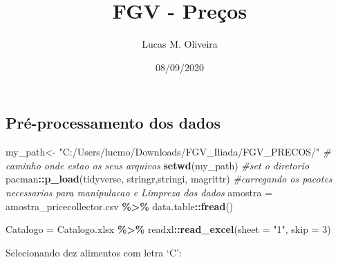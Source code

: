 \documentclass[
]{article}
\title{FGV - Preços}
\author{Lucas M. Oliveira}
\date{08/09/2020}
\newenvironment{Shaded}{\begin{snugshade}}{\end{snugshade}}
\newcommand{\CommentTok}[1]{\textcolor[rgb]{0.56,0.35,0.01}{\textit{#1}}}
\newcommand{\DataTypeTok}[1]{\textcolor[rgb]{0.13,0.29,0.53}{#1}}
\newcommand{\DecValTok}[1]{\textcolor[rgb]{0.00,0.00,0.81}{#1}}
\newcommand{\KeywordTok}[1]{\textcolor[rgb]{0.13,0.29,0.53}{\textbf{#1}}}
\newcommand{\NormalTok}[1]{#1}
\newcommand{\OperatorTok}[1]{\textcolor[rgb]{0.81,0.36,0.00}{\textbf{#1}}}
\newcommand{\StringTok}[1]{\textcolor[rgb]{0.31,0.60,0.02}{#1}}
\begin{document}
\maketitle

\hypertarget{pruxe9-processamento-dos-dados}{%
\subsection{Pré-processamento dos
dados}\label{pruxe9-processamento-dos-dados}}

\begin{Shaded}
\begin{Highlighting}[]
\NormalTok{my\_path\textless{}{-}}\StringTok{ "C:/Users/lucmo/Downloads/FGV\_Iliada/FGV\_PRECOS/"} \CommentTok{\# caminho onde estao os seus arquivos}
\KeywordTok{setwd}\NormalTok{(my\_path) }\CommentTok{\#set o diretorio }
\NormalTok{pacman}\OperatorTok{::}\KeywordTok{p\_load}\NormalTok{(}\StringTok{\textquotesingle{}tidyverse\textquotesingle{}}\NormalTok{,}
               \StringTok{\textquotesingle{}stringr\textquotesingle{}}\NormalTok{,}\StringTok{\textquotesingle{}stringi\textquotesingle{}}\NormalTok{,}
               \StringTok{\textquotesingle{}magrittr\textquotesingle{}}\NormalTok{) }\CommentTok{\#carregando os pacotes necessarios para manipulacao e Limpreza dos dados}
\NormalTok{amostra =}\StringTok{ \textquotesingle{}amostra\_pricecollector.csv\textquotesingle{}} \OperatorTok{\%\textgreater{}\%}\StringTok{ }
\StringTok{                        }\NormalTok{data.table}\OperatorTok{::}\KeywordTok{fread}\NormalTok{()}

\NormalTok{Catalogo =}\StringTok{ \textquotesingle{}Catalogo.xlsx\textquotesingle{}} \OperatorTok{\%\textgreater{}\%}\StringTok{ }
\StringTok{                    }\NormalTok{readxl}\OperatorTok{::}\KeywordTok{read\_excel}\NormalTok{(}\DataTypeTok{sheet =} \StringTok{"1"}\NormalTok{, }\DataTypeTok{skip =} \DecValTok{3}\NormalTok{) }
\end{Highlighting}
\end{Shaded}

Selecionando dez alimentos com letra `C':
\end{document}
